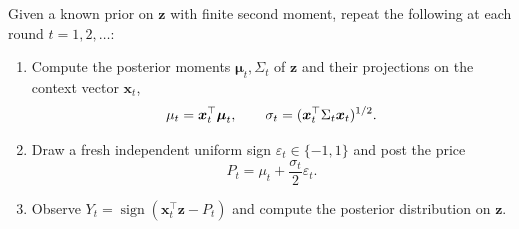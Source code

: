 \documentclass[11pt]{article}
\newcommand{\bmu}{\boldsymbol\mu}
\newcommand{\bx}{\boldsymbol x}
\newcommand{\bz}{\boldsymbol z}
\begin{document}
\begin{algorithm}[H]
\caption{Bayesian Contextual Search}\label{alg:bayesian}
\vspace{3pt}
Given a known prior on $\bz$ with finite second moment, repeat the following at each round $t=1,2,\ldots$:
\begin{enumerate}
 \item Compute the posterior moments $\bmu_t,\Sigma_t$ of $\bz$ and their projections on the context vector $\bx_t$,
 \[
   \mu_t=\bx_t^\top\bmu_t,\qquad
   \sigma_t=\agsqrt{\bx_t^\top\Sigma_t\bx_t}.
 \]
 \item Draw a fresh independent uniform sign $\varepsilon_t\in\{-1,1\}$ and post the price
 \[
   P_t=\mu_t+\frac{\sigma_t}{2}\varepsilon_t.
 \]
 \item Observe $Y_t=\operatorname{sign}(\bx_t^\top\bz-P_t)$ and compute the posterior distribution on $\bz$.
\end{enumerate}
\end{algorithm}
\end{document}
